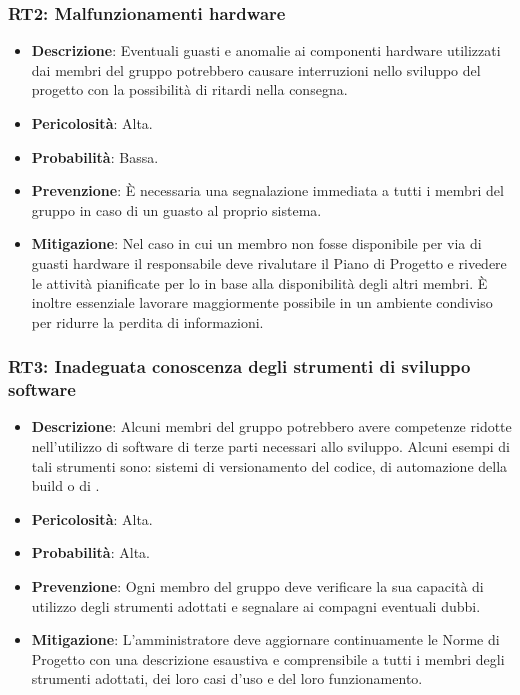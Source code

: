 \subsubsection{RT2: Malfunzionamenti hardware}
\label{rischio:RT2}
\begin{itemize}
    \item \textbf{Descrizione}: Eventuali guasti e anomalie ai componenti hardware utilizzati dai membri del gruppo potrebbero causare 
    interruzioni nello sviluppo del progetto con la possibilità di ritardi nella consegna.
    \item \textbf{Pericolosità}: Alta.
    \item \textbf{Probabilità}: Bassa.
    \item \textbf{Prevenzione}: È necessaria una segnalazione immediata a tutti i membri del gruppo in caso di un guasto al proprio sistema.
    \item \textbf{Mitigazione}: Nel caso in cui un membro non fosse disponibile per via di guasti hardware il responsabile deve rivalutare il Piano di Progetto e rivedere le attività pianificate per lo  in base alla disponibilità degli altri membri.
    È inoltre essenziale lavorare maggiormente possibile in un ambiente condiviso per ridurre la perdita di informazioni.
\end{itemize}

\subsubsection{RT3: Inadeguata conoscenza degli strumenti di sviluppo software}
\label{rischio:RT3}
\begin{itemize}
    \item \textbf{Descrizione}: Alcuni membri del gruppo potrebbero avere competenze ridotte nell'utilizzo di software di terze parti necessari allo sviluppo.
    Alcuni esempi di tali strumenti sono: sistemi di versionamento del codice, di automazione della build o di .
    \item \textbf{Pericolosità}: Alta.
    \item \textbf{Probabilità}: Alta.
    \item \textbf{Prevenzione}: Ogni membro del gruppo deve verificare la sua capacità di utilizzo degli strumenti adottati e segnalare ai compagni eventuali dubbi.
    \item \textbf{Mitigazione}: L'amministratore deve aggiornare continuamente le Norme di Progetto con una descrizione esaustiva e comprensibile a tutti i membri degli strumenti adottati, dei loro casi d'uso e del loro funzionamento.
\end{itemize}

